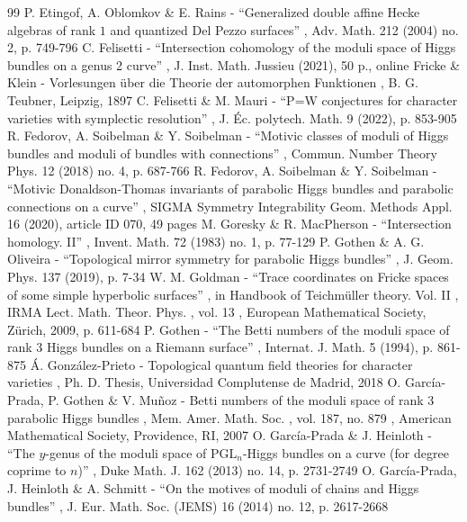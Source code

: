 \documentclass[11pt]{article}
\theoremstyle{definition}
\theoremstyle{plain}
\begin{document}
\begin{thebibliography}{99}
 P. Etingof, A. Oblomkov \& E. Rains - “Generalized double affine Hecke algebras of rank $1$ and quantized Del Pezzo surfaces” , Adv. Math. 212 (2004) no. 2, p. 749-796
 C. Felisetti - “Intersection cohomology of the moduli space of Higgs bundles on a genus 2 curve” , J. Inst. Math. Jussieu (2021), 50 p., online
 Fricke \& Klein - Vorlesungen über die Theorie der automorphen Funktionen , B. G. Teubner, Leipzig, 1897
 C. Felisetti \& M. Mauri - “P=W conjectures for character varieties with symplectic resolution” , J. Éc. polytech. Math. 9 (2022), p. 853-905
 R. Fedorov, A. Soibelman \& Y. Soibelman - “Motivic classes of moduli of Higgs bundles and moduli of bundles with connections” , Commun. Number Theory Phys. 12 (2018) no. 4, p. 687-766
 R. Fedorov, A. Soibelman \& Y. Soibelman - “Motivic Donaldson-Thomas invariants of parabolic Higgs bundles and parabolic connections on a curve” , SIGMA Symmetry Integrability Geom. Methods Appl. 16 (2020), article ID 070, 49 pages
 M. Goresky \& R. MacPherson - “Intersection homology. II” , Invent. Math. 72 (1983) no. 1, p. 77-129
 P. Gothen \& A. G. Oliveira - “Topological mirror symmetry for parabolic Higgs bundles” , J. Geom. Phys. 137 (2019), p. 7-34
 W. M. Goldman - “Trace coordinates on Fricke spaces of some simple hyperbolic surfaces” , in Handbook of Teichmüller theory. Vol. II , IRMA Lect. Math. Theor. Phys. , vol. 13 , European Mathematical Society, Zürich, 2009, p. 611-684
 P. Gothen - “The Betti numbers of the moduli space of rank $3$ Higgs bundles on a Riemann surface” , Internat. J. Math. 5 (1994), p. 861-875
 Á. González-Prieto - Topological quantum field theories for character varieties , Ph. D. Thesis, Universidad Complutense de Madrid, 2018
 O. García-Prada, P. Gothen \& V. Muñoz - Betti numbers of the moduli space of rank $3$ parabolic Higgs bundles , Mem. Amer. Math. Soc. , vol. 187, no. 879 , American Mathematical Society, Providence, RI, 2007
 O. García-Prada \& J. Heinloth - “The $y$-genus of the moduli space of $\mathrm{PGL}_{n}$-Higgs bundles on a curve (for degree coprime to $n$)” , Duke Math. J. 162 (2013) no. 14, p. 2731-2749
 O. García-Prada, J. Heinloth \& A. Schmitt - “On the motives of moduli of chains and Higgs bundles” , J. Eur. Math. Soc. (JEMS) 16 (2014) no. 12, p. 2617-2668

\end{thebibliography}
\end{document}
